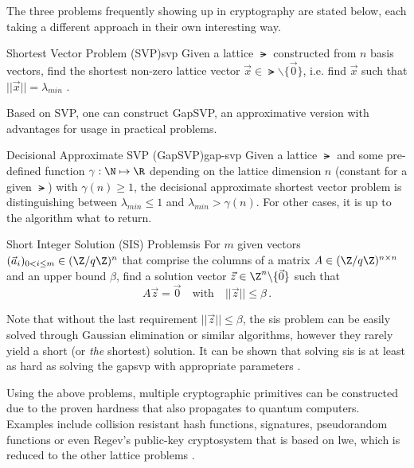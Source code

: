 The three problems frequently showing up in cryptography are stated below, each taking a different approach in their own interesting way.

\begin{definition}{Shortest Vector Problem (SVP)}{svp}
  Given a lattice $\lat$ constructed from $n$ basis vectors, find the shortest non-zero lattice vector $\vec{x} \in \lat \backslash \{\vec{0}\}$, i.e. find $\vec{x}$ such that $||\vec{x}|| = \lambda_{min}$ \parencite{2016-decade-of-lattice}.
\end{definition}

Based on SVP, one can construct GapSVP, an approximative version with advantages for usage in practical problems.

\begin{definition}{Decisional Approximate SVP (GapSVP)}{gap-svp}
  Given a lattice $\lat$ and some pre-defined function $\gamma: \N \mapsto \R$ depending on the lattice dimension $n$ (constant for a given $\lat$) with $\gamma(n) \geq 1$, the decisional approximate shortest vector problem is distinguishing between $\lambda_{min} \leq 1$ and $\lambda_{min} > \gamma(n)$.
  For other cases, it is up to the algorithm what to return.
\end{definition}

\begin{definition}{Short Integer Solution (SIS) Problem}{sis}
  For $m$ given vectors $(\vec{a}_i)_{0 < i \leq m} \in (\Z / q\Z)^n$ that comprise the columns of a matrix
  $A \in (\Z / q\Z)^{n \times n}$ and an upper bound $\beta$, find
  a solution vector $\vec{z} \in \Z^n \backslash \{\vec{0}\}$ such that
  $$A \vec{z} = \vec{0} \quad \mathrm{with} \quad ||\vec{z}|| \leq \beta\,.$$
\end{definition}

Note that without the last requirement $||\vec{z}|| \leq \beta$, the \gls{sis} problem can be easily solved through Gaussian elimination or similar algorithms, however they rarely yield a short (or \textit{the} shortest) solution.
It can be shown that solving \gls{sis} is at least as hard as solving the \gls{gapsvp} with appropriate parameters \parencite{1996-hard-lattice-problems}.

Using the above problems, multiple cryptographic primitives can be constructed due to the proven hardness that also propagates to quantum computers.
Examples include collision resistant hash functions, signatures, pseudorandom functions or even Regev's public-key cryptosystem that is based on \gls{lwe}, which is reduced to the other lattice problems \parencite{2016-decade-of-lattice}.

